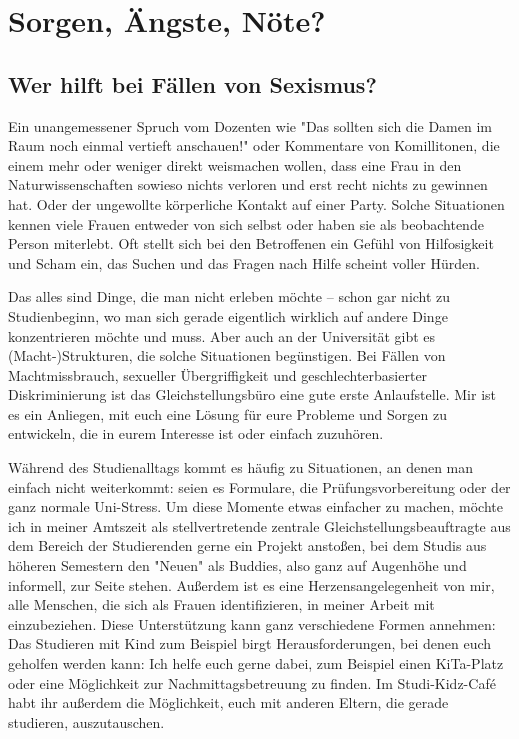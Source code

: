 \section{Sorgen, Ängste, Nöte?}
\subsection{Wer hilft bei Fällen von Sexismus?}

\begin{multicols}{2}
Ein unangemessener Spruch vom Dozenten wie "Das sollten sich die Damen im Raum noch einmal vertieft anschauen!" oder Kommentare von Komillitonen, die einem mehr oder weniger direkt weismachen wollen, dass eine Frau in den Naturwissenschaften sowieso nichts verloren und erst recht nichts zu gewinnen hat. Oder der ungewollte körperliche Kontakt auf einer Party. Solche Situationen kennen viele Frauen entweder von sich selbst oder haben sie als beobachtende Person miterlebt. Oft stellt sich bei den Betroffenen ein Gefühl von Hilfosigkeit und Scham ein, das Suchen und das Fragen nach Hilfe scheint voller Hürden.

Das alles sind Dinge, die man nicht erleben möchte – schon gar nicht zu Studienbeginn, wo man sich gerade eigentlich wirklich auf andere Dinge konzentrieren möchte und muss. Aber auch an der Universität gibt es (Macht-)Strukturen, die solche Situationen begünstigen. 
Bei Fällen von Machtmissbrauch, sexueller Übergriffigkeit und geschlechterbasierter Diskriminierung ist das Gleichstellungsbüro eine gute erste Anlaufstelle. Mir ist es ein Anliegen, mit euch eine Lösung für eure Probleme und Sorgen zu entwickeln, die in eurem Interesse ist oder einfach zuzuhören. 

Während des Studienalltags kommt es häufig zu Situationen, an denen man einfach nicht weiterkommt: seien es Formulare, die Prüfungsvorbereitung oder der ganz normale Uni-Stress. Um diese Momente etwas einfacher zu machen, möchte ich in meiner Amtszeit als stellvertretende zentrale Gleichstellungsbeauftragte aus dem Bereich der Studierenden gerne ein Projekt anstoßen, bei dem Studis aus höheren Semestern den "Neuen" als Buddies, also ganz auf Augenhöhe und informell, zur Seite stehen. 
Außerdem ist es eine Herzensangelegenheit von mir, alle Menschen, die sich als Frauen identifizieren, in meiner Arbeit mit einzubeziehen. 
Diese Unterstützung kann ganz verschiedene Formen annehmen: Das Studieren mit Kind zum Beispiel birgt Herausforderungen, bei denen euch geholfen werden kann: Ich helfe euch gerne dabei, zum Beispiel einen KiTa-Platz oder eine Möglichkeit zur Nachmittagsbetreuung zu finden. Im Studi-Kidz-Café habt ihr außerdem die Möglichkeit, euch mit anderen Eltern, die gerade studieren, auszutauschen. 


\end{multicols}
